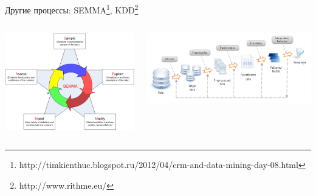\documentclass[aspectratio=169]{beamer}
\begin{document}
\begin{frame}{Другие процессы: SEMMA\footnote{http://timkienthuc.blogspot.ru/2012/04/crm-and-data-mining-day-08.html}, KDD\footnote{http://www.rithme.eu/}}

\begin{columns}
    \begin{column}{.5\textwidth}
    	\includegraphics[width=\textwidth]{images/semma.png}
    \end{column}
       
    \begin{column}{.5\textwidth}
    \vspace{-0em}
	\begin{center}
   		\includegraphics[width=\textwidth]{images/kdd.png}
    \end{center}
    \end{column}
  \end{columns}

\end{frame}
\end{document}
